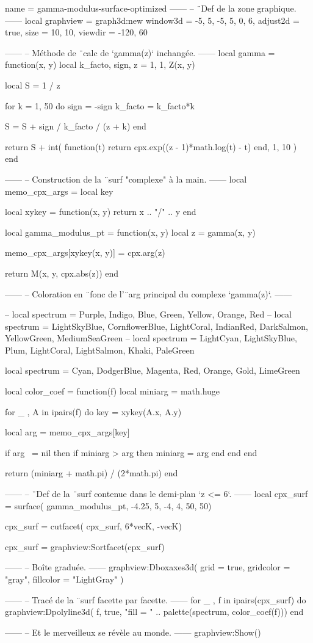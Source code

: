 \documentclass{standalone}
\begin{document}
\begin{luadraw}{name = gamma-modulus-surface-optimized}
------
-- ¨Def de la zone graphique.
------
local graphview = graph3d:new{
  window3d = {-5, 5, -5, 5, 0, 6},
  adjust2d = true,
  size     = {10, 10},
  viewdir  = {-120, 60}
}

------
-- Méthode de ¨calc de `gamma(z)` inchangée.
------
local gamma = function(x, y)
  local k_facto, sign, z = 1, 1, Z(x, y)

  local S = 1 / z

  for k = 1, 50 do
    sign    = -sign
    k_facto = k_facto*k

    S = S + sign / k_facto / (z + k)
  end

  return S + int(
    function(t)
      return cpx.exp((z - 1)*math.log(t) - t)
    end,
    1, 10
  )
end

------
-- Construction de la ¨surf "complexe" à la main.
------
local memo_cpx_args = {}
local key

local xykey = function(x, y)
    return x .. "/" .. y
end

local gamma_modulus_pt = function(x, y)
  local z = gamma(x, y)

  memo_cpx_args[xykey(x, y)] = cpx.arg(z)

  return M(x, y, cpx.abs(z))
end

------
-- Coloration en ¨fonc de l'¨arg principal du complexe `gamma(z)`.
------

-- local spectrum = {Purple, Indigo, Blue, Green, Yellow, Orange, Red}
-- local spectrum = {LightSkyBlue, CornflowerBlue, LightCoral, IndianRed, DarkSalmon, YellowGreen, MediumSeaGreen}
-- local spectrum = {LightCyan, LightSkyBlue, Plum, LightCoral, LightSalmon, Khaki, PaleGreen}

local spectrum = {Cyan, DodgerBlue, Magenta, Red, Orange, Gold, LimeGreen}

local color_coef = function(f)
  local miniarg = math.huge

  for _ , A in ipairs(f) do
    key = xykey(A.x, A.y)

    local arg = memo_cpx_args[key]

    if arg ~= nil then
      if miniarg > arg then
        miniarg = arg
      end
    end
  end

  return (miniarg + math.pi) / (2*math.pi)
end

------
-- ¨Def de la ¨surf contenue dans le demi-plan `z <= 6`.
------
local cpx_surf = surface(
  gamma_modulus_pt,
  -4.25, 5, -4, 4,
  {50, 50})

cpx_surf = cutfacet(
  cpx_surf,
  {6*vecK, -vecK})

cpx_surf = graphview:Sortfacet(cpx_surf)

------
-- Boîte graduée.
------
graphview:Dboxaxes3d({
  grid      = true,
  gridcolor = "gray",
  fillcolor = "LightGray"
})

------
-- Tracé de la ¨surf facette par facette.
------
for _ , f in ipairs(cpx_surf) do
  graphview:Dpolyline3d(
    f,
    true,
       "fill = "
    .. palette(spectrum, color_coef(f)))
end

------
-- Et le merveilleux se révèle au monde.
------
graphview:Show()
\end{luadraw}
\end{document}

